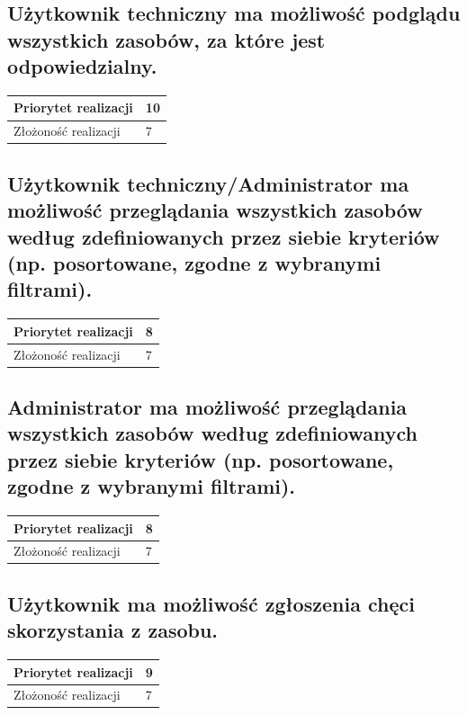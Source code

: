 \documentclass[11pt, a4paper, oneside]{report}
\begin{document}
\subsection{Użytkownik techniczny ma możliwość podglądu wszystkich zasobów, za które jest odpowiedzialny.}
\begin{center}
\begin{tabular}[c]{| l | l | }
  \hline			
  Priorytet realizacji & 10 \\
  \hline
  Złożoność realizacji & 7 \\
  \hline  
\end{tabular}
\end{center}
\subsection{Użytkownik techniczny/Administrator ma możliwość przeglądania wszystkich zasobów według zdefiniowanych przez siebie kryteriów (np. posortowane, zgodne z wybranymi filtrami).}
\begin{center}
\begin{tabular}[c]{| l | l | }
  \hline			
  Priorytet realizacji & 8 \\
  \hline
  Złożoność realizacji & 7 \\
  \hline  
\end{tabular}
\end{center}
\subsection{Administrator ma możliwość przeglądania wszystkich zasobów według zdefiniowanych przez siebie kryteriów (np. posortowane, zgodne z wybranymi filtrami).}
\begin{center}
\begin{tabular}[c]{| l | l | }
  \hline			
  Priorytet realizacji & 8 \\
  \hline
  Złożoność realizacji & 7 \\
  \hline  
\end{tabular}
\end{center}

\subsection{Użytkownik ma możliwość zgłoszenia chęci skorzystania z zasobu.}
\begin{center}
\begin{tabular}[c]{| l | l | }
  \hline			
  Priorytet realizacji & 9 \\
  \hline
  Złożoność realizacji & 7 \\
  \hline  
\end{tabular}
\end{center}
\end{document}
